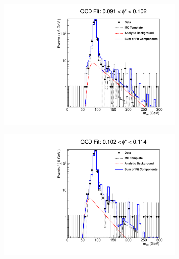 \begin{figure}[!htbp]
    \centering
    \begin{subfigure}[b]{\SideBySidePlotWidth}
        \includegraphics[width=\linewidth]{figures/qcd_fits/qcd_fit_plot_for_17.pdf}
        \caption{}
        \label{fig:qcd_fit_17}
    \end{subfigure}%
    \begin{subfigure}[b]{\SideBySidePlotWidth}
        \includegraphics[width=\linewidth]{figures/qcd_fits/qcd_fit_plot_for_18.pdf}
        \caption{}
        \label{fig:qcd_fit_18}
    \end{subfigure}
    \begin{subfigure}[b]{\SideBySidePlotWidth}

\end{subfigure}
\end{figure}
